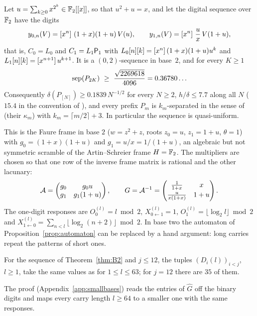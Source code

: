 \begin{theorem}[Base 2]\label{thm:B2}
Let $u=\sum_{k\ge0}x^{2^k}\in\mathbb{F}_2[[x]]$, so that $u^2+u=x$, and let the digital sequence over $\mathbb{F}_2$ have the digits
\[
y_{0,n}(V)=[x^{n}]\,\,(1+x)(1+u)\,V(u),\qquad y_{1,n}(V)=[x^{n}]\,\,\frac ux\,V(1+u),
\]
that is, $C_0=L_0$ and $C_1=L_1\mathsf{P}_1$ with $L_0[n][k]=[x^{n}]\,(1+x)(1+u)u^k$ and $L_1[n][k]=[x^{n+1}]\,u^{k+1}$. It is a $(0,2)$-sequence in base~$2$, and for every $K\ge1$
\[
\sep{P_{2K}}\ \ge\ \frac{\sqrt{2269618}}{4096}=0.36780\ldots
\]
Consequently $\delta(P_{[N]})\ge0.1839\,N^{-1/2}$ for every $N\ge2$, $h/\delta\le7.7$ along all $N$ ($15.4$ in the convention of \cite{DGS2}), and every prefix $P_m$ is $k_m$-separated in the sense of \cite{DGS2} (their $\kappa_m$) with $k_m=\lceil m/2\rceil+3$. In particular the sequence is quasi-uniform.
\end{theorem}

This is the Faure frame in base $2$ ($w=z^2+z$, roots $z_0=u$, $z_1=1+u$, $\theta=1$) with $g_0=(1+x)(1+u)$ and $g_1=u/x=1/(1+u)$, an algebraic but not symmetric scramble of the Artin--Schreier frame $H=\mathbb{F}_2$. The multipliers are chosen so that one row of the inverse frame matrix is rational and the other lacunary:
\begin{equation}\label{eq:B2G}
\mathcal{A}=\begin{pmatrix}g_0&g_0u\\ g_1&g_1(1+u)\end{pmatrix},\qquad G=\mathcal{A}^{-1}=\begin{pmatrix}\frac1{1+x}&x\\[2pt] \frac u{x(1+x)}&1+u\end{pmatrix}.
\end{equation}
The one-digit responses are $O_0^{(l)}=l\bmod2$, $X_{0\leftarrow1}^{(l)}=1$, $O_1^{(l)}=\lfloor\log_2l\rfloor\bmod2$ and $X_{1\leftarrow0}^{(l)}=\sum_{n<l}\lfloor\log_2(n+2)\rfloor\bmod2$. In base two the automaton of Proposition~\ref{prop:automaton} can be replaced by a hand argument: long carries repeat the patterns of short ones.

\begin{lemma}\label{lem:octave}
For the sequence of Theorem~\ref{thm:B2} and $j\le12$, the tuples $(D_i(l))_{i<j}$, $l\ge1$, take the same values as for $1\le l\le63$; for $j=12$ there are $35$ of them.
\end{lemma}

The proof (Appendix~\ref{app:smallbases}) reads the entries of $\hat G$ off the binary digits and maps every carry length $l\ge64$ to a smaller one with the same responses.

